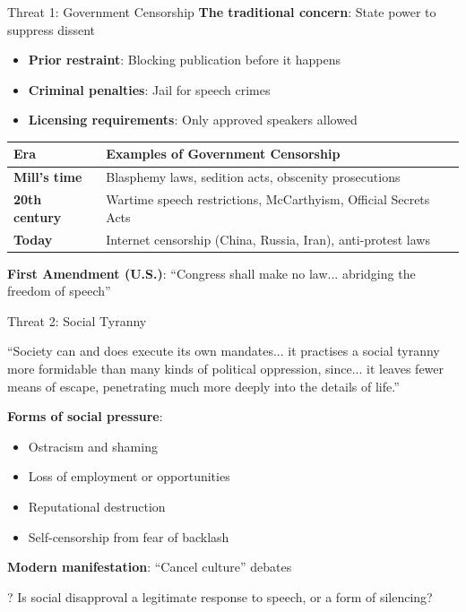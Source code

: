 ﻿\documentclass[aspectratio=169]{beamer}
\begin{document}
\begin{frame}{Threat 1: Government Censorship}
\textbf{The traditional concern}: State power to suppress dissent

\begin{itemize}
    \item \textbf{Prior restraint}: Blocking publication before it happens
    \item \textbf{Criminal penalties}: Jail for speech crimes
    \item \textbf{Licensing requirements}: Only approved speakers allowed
\end{itemize}

\vspace{0.3cm}
\begin{table}[h]
\centering
\small
\begin{tabular}{>{\bfseries}l p{8cm}}
\toprule
Era & Examples of Government Censorship \\
\midrule
Mill's time & Blasphemy laws, sedition acts, obscenity prosecutions \\
20th century & Wartime speech restrictions, McCarthyism, Official Secrets Acts \\
Today & Internet censorship (China, Russia, Iran), anti-protest laws \\
\bottomrule
\end{tabular}
\end{table}

\vspace{0.2cm}
\textbf{First Amendment (U.S.)}: ``Congress shall make no law... abridging the freedom of speech''
\end{frame}

\begin{frame}{Threat 2: Social Tyranny}
\begin{quotebox}
``Society can and does execute its own mandates... it practises a social tyranny more formidable than many kinds of political oppression, since... it leaves fewer means of escape, penetrating much more deeply into the details of life.''
\end{quotebox}

\vspace{0.2cm}
\textbf{Forms of social pressure}:
\begin{itemize}
    \item Ostracism and shaming
    \item Loss of employment or opportunities
    \item Reputational destruction
    \item Self-censorship from fear of backlash
\end{itemize}

\vspace{0.2cm}
\textbf{Modern manifestation}: ``Cancel culture'' debates

\begin{alertblock}{?}
Is social disapproval a legitimate response to speech, or a form of silencing?
\end{alertblock}
\end{frame}
\end{document}
